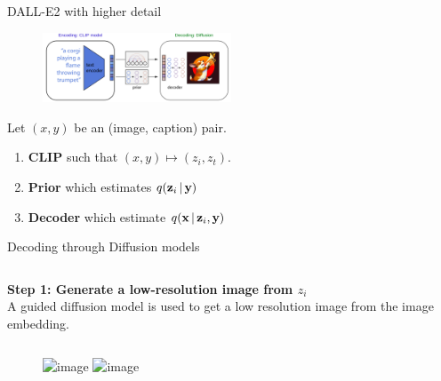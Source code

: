 \documentclass[aspectratio=169, 9pt]{beamer}
\theoremstyle{definition}
\begin{document}
\begin{frame}{DALL-E2 with higher detail}
  \begin{figure}[h]
    \centering
    \includegraphics[width=0.5\textwidth]{./pic/dalle-encdec.png}
  \end{figure}
  Let $(x,y)$ be an (image, caption) pair.
  \begin{enumerate}
    \item \textbf{CLIP} such that $(x,y)\mapsto(z_i, z_t)$.
    \item \textbf{Prior} which estimates $q({\mathbf{z}}_i\,\vert\,{\mathbf{y}})$ \hfill
    \item \textbf{Decoder} which estimate $q(\mathbf{x}\,\vert\, {\mathbf{z}}_i,
      {\mathbf{y}})$\hfill
  \end{enumerate}
\end{frame}
\begin{frame}{Decoding through Diffusion models}
  \begin{columns}
    \begin{column}{0.5\textwidth}
      \begin{center}
        \textbf{Step 1: Generate a low-resolution image from $z_i$}\\
      A guided diffusion model is used to get a low resolution image from
      the image embedding.
      \end{center}
    \end{column}
    \begin{column}{0.5\textwidth}
    \end{column}
  \end{columns}
  \begin{figure}[h]
    \centering
    \includegraphics<1>[clip, width=\textwidth, trim = 0 8cm 0 10cm]{./pic/dalle-decoder_1.png}%
    \includegraphics<2->[clip, width=\textwidth, trim= 0 8cm 0 10cm]{./pic/dalle-decoder_2.png}
  \end{figure}
\end{frame}
\end{document}
